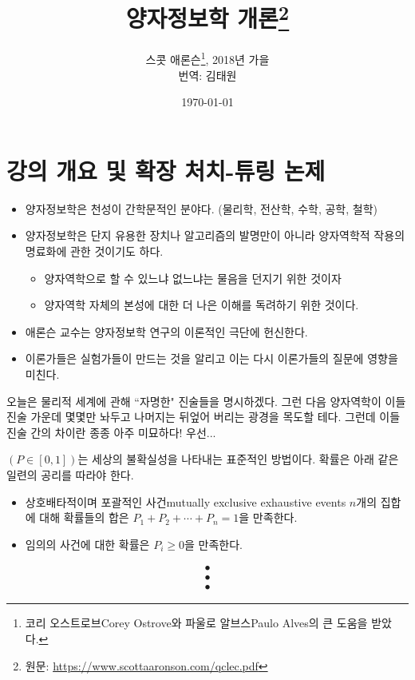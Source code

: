 \documentclass[a4paper,chapter,atbegshi,]{oblivoir}
\begin{document}
\title{양자정보학 개론\thanks{원문: \url{https://www.scottaaronson.com/qclec.pdf}}}
\author{
  스콧 애론슨\thanks{코리 오스트로브{\tiny Corey Ostrove}와 
  파울로 알브스{\tiny Paulo Alves}의 큰 도움을 받았다.}, 
    2018년 가을\\
    번역: 김태원
}
\date{\today}
\newpage
\maketitle\thispagestyle{empty}\newpage

\tableofcontents\pagestyle{mystyle}

\chapter{강의 개요 및 확장 처치-튜링 논제}
\begin{itemize}[label=\(\blacktriangleright\)]
    \item 양자정보학은 천성이 간학문적인 분야다. (물리학, 전산학, 수학, 공학, 철학)
    \item 양자정보학은 단지 유용한 장치나 알고리즘의 발명만이 아니라 양자역학적 작용의 명료화에 관한 것이기도 하다.
    \begin{itemize}
        \item 양자역학으로 할 수 있느냐 없느냐는 물음을 던지기 위한 것이자
        \item 양자역학 자체의 본성에 대한 더 나은 이해를 독려하기 위한 것이다.
    \end{itemize}
    \item 애론슨 교수는 양자정보학 연구의 이론적인 극단에 헌신한다.
    \item 이론가들은 실험가들이 만드는 것을 알리고 이는 다시 이론가들의 질문에 영향을 미친다.
\end{itemize}

\hfill

오늘은 물리적 세계에 관해 ``자명한" 진술들을 명시하겠다.
그런 다음 양자역학이 이들 진술 가운데 몇몇만 놔두고 나머지는 뒤엎어 버리는 광경을
목도할 테다. 
그런데 이들 진술 간의 차이란 종종 아주 미묘하다!
우선...\hfill\break

\begin{description}[leftmargin=0cm]
    \item[\textbf{확률}\;] 
        $(P\in[0,1])$는 세상의 불확실성을 나타내는 표준적인 방법이다. 
        확률은 아래 같은 일련의 공리를 따라야 한다.
        \begin{itemize}[label=$\blacktriangleright$]
            \item  상호배타적이며 포괄적인 사건{\footnotesize mutually exclusive
            exhaustive events} $n$개의 집합에 대해  
                확률들의 합은 $P_1+P_2+\cdots+P_n=1$을 만족한다.
            \item 임의의 사건에 대한 확률은 $P_i\geq0$을 만족한다.
        \end{itemize}
        \begin{align*}\bullet\\\bullet\\\bullet\end{align*}
\end{description}
\end{document}
